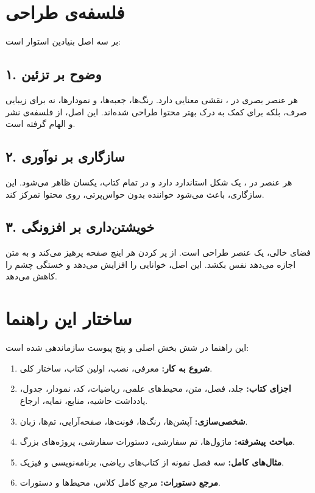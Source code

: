 \section*{فلسفه‌ی طراحی}

 بر سه اصل بنیادین استوار است:

\subsection*{۱. وضوح بر تزئین}

هر عنصر بصری در ، نقشی معنایی دارد.
رنگ‌ها، جعبه‌ها، و نمودارها، نه برای زیبایی صرف،
بلکه برای کمک به درک بهتر محتوا طراحی شده‌اند.
این اصل، از فلسفه‌ی نشر  و
 الهام گرفته است.

\subsection*{۲. سازگاری بر نوآوری}

هر عنصر در ، یک شکل استاندارد دارد
و در تمام کتاب، یکسان ظاهر می‌شود. این سازگاری،
باعث می‌شود خواننده بدون حواس‌پرتی، روی محتوا
تمرکز کند.

\subsection*{۳. خویشتن‌داری بر افزونگی}

فضای خالی، یک عنصر طراحی است. 
از پر کردن هر اینچ صفحه پرهیز می‌کند و به متن
اجازه می‌دهد نفس بکشد. این اصل، خوانایی را
افزایش می‌دهد و خستگی چشم را کاهش می‌دهد.

\section*{ساختار این راهنما}

این راهنما در شش بخش اصلی و پنج پیوست سازماندهی
شده است:

\begin{enumerate}
    \item \textbf{شروع به کار:} معرفی، نصب، اولین
    کتاب، ساختار کلی.

    \item \textbf{اجزای کتاب:} جلد، فصل، متن، محیط‌های
    علمی، ریاضیات، کد، نمودار، جدول، یادداشت حاشیه،
    منابع، نمایه، ارجاع.

    \item \textbf{شخصی‌سازی:} آپشن‌ها، رنگ‌ها، فونت‌ها،
    صفحه‌آرایی، تم‌ها، زبان.

    \item \textbf{مباحث پیشرفته:} ماژول‌ها، تم سفارشی،
    دستورات سفارشی، پروژه‌های بزرگ.

    \item \textbf{مثال‌های کامل:} سه فصل نمونه از
    کتاب‌های ریاضی، برنامه‌نویسی و فیزیک.

    \item \textbf{مرجع دستورات:} مرجع کامل کلاس،
    محیط‌ها و دستورات.
\end{enumerate}

